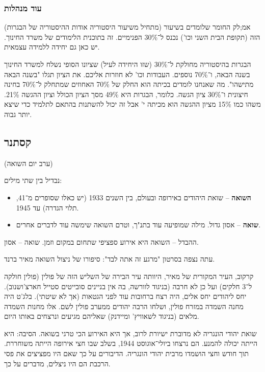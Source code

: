 \documentclass[a4paper]{book}
\begin{document}
	\subsubsection{עוד מנהלות}
	
	(מתחיל משיעור היסטוריה אודות ההיסטוריה של הבגרות) אמ;לק החומר שלומדים בשיעור הזה (תקופת הבית השני וכו') נכנס ל־30\% הפנימיים. זה בתוכנית הלימודים של משרד החינוך. יש כאן גם יחידה ללמידה עצמאית. 
	
	הבגרות בהיסטוריה מחולקת ל־30\% (שזו היחידה לעיל) שציונו הסופי נשלח למשרד החינוך בשנה הבאה, ו־70\% נוספים. העבודות וכו' לא חוזרות אליכם. את הציון תגלו "בשנה הבאה מתישהו". מה שאנחנו לומדים בכיתה הוא החלק של 70\% האחוזים שמתחלק ל־70\% בחינה חיצונית ו־30\% ציון הגשה. כלומר, הבגרות היא 49\% מסך הציון הכולל וציון ההגשה 21\%. משהו כמו 15\% מציון ההגשה הוא מכיתה י' אבל זה יכול להשתנות בהתאם לתלמיד כדי שיצא יותר גבוה. 
	
	\subsection{קסתנר}
	(ערב יום השואה)
	
	נבדיל בין שתי מילים: 
	\begin{itemize}
		\item \textbf{השואה} – שואת היהודים באירופה ובעולם, בין השנים 1933 (יש כאלו שסופרים מ־41, תלוי הגדרה) עד 1945. 
		\item \textbf{שואה} – אסון גדול. מילה שמופיעה עוד בתנ"ך, וטרם השואה שימשה עוד לדברים אחרים. 
	\end{itemize}
	
	ההבדל – השואה היא אירוע ספציפי שתחום במקום וזמן. שואה – אסון. 
	
	עתה נצפה בסרטון "מרגע זה אתה לבד": סיפורו של ניצול השואה מאיר ברנד. 
	
	קרקוב, העיר המקורית של מאיר, היוותה עיר הבירה של השליש הזה של פולין (פולין חולקה ל־3 חלקים) ועל כן לא חרבה (בניגוד לוורשה, בה אין בניינים סובייטים סטייל חארצ'ושנוב). יחס ליהודים יחס אלים, היה רצח ברחובות עוד לפני הגטאות (אך לא שיטתי). בלג'ט היה מחנה השמדה במזרח פולין, ושלחו הרבה יהודים ממערב פולין לשם. אלו מחנות השמדה מלאים (בניגוד לשאוויץ' ומיידנק) שאליהם מגיעים ונרצחים באותו היום. 
	
	שואת יהודי הונגריה לא מדוברת ישיורת לרוב, אך היא האירוע הכי טרגי בשואה. הסיבה: היא הייתה יכולה להמנע. הם נרצחו ביולי־אוגוסט 1944, בשלב שבו חצי אירופה הייתה משוחררת. תוך חודש וחצי הושמדו מרבית יהודי הונגריה. הדיבורים על כך שאם היו מפציצים את פסי הרכבת הם היו ניצלים, מדברים על כך. 
	
\end{document}

